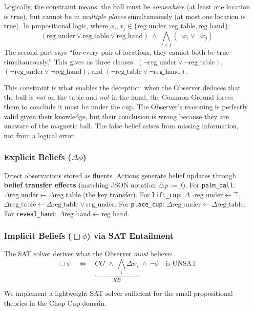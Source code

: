\documentclass[11pt]{article}
\newcommand{\EBel}[1]{\ensuremath{\Delta #1}} %
\newcommand{\IBel}[1]{\ensuremath{\Box #1}}   %
\newcommand{\CG}{\ensuremath{\mathit{CG}}}    %
\begin{document}
Logically, the constraint means: the ball must be \emph{somewhere} (at least one location is true), but cannot be in \emph{multiple places} simultaneously (at most one location is true). In propositional logic, where $x_i, x_j \in \{\text{reg\_under}, \text{reg\_table}, \text{reg\_hand}\}$:
\[
    (\text{reg\_under} \lor \text{reg\_table} \lor \text{reg\_hand}) 
    \;\land\; 
    \bigwedge_{i < j} (\neg x_i \lor \neg x_j)
\]
The second part says ``for every pair of locations, they cannot both be true simultaneously.'' This gives us three clauses: $(\neg\text{reg\_under} \lor \neg\text{reg\_table})$, $(\neg\text{reg\_under} \lor \neg\text{reg\_hand})$, and $(\neg\text{reg\_table} \lor \neg\text{reg\_hand})$.

This constraint is what enables the deception: when the Observer deduces that the ball is \emph{not} on the table and \emph{not} in the hand, the Common Ground forces them to conclude it must be under the cup. The Observer's reasoning is perfectly valid given their knowledge, but their conclusion is wrong because they are unaware of the magnetic ball. The false belief arises from missing information, not from a logical error.

\subsubsection{Explicit Beliefs ($\EBel{\phi}$)}
Direct observations stored as fluents. Actions generate belief updates through \textbf{belief transfer effects} (matching JSON notation $\triangle p := f$).
For \texttt{palm\_ball}: $\EBel{\text{reg\_under}} \gets \EBel{\text{reg\_table}}$ (the key transfer).
For \texttt{lift\_cup}: $\EBel{\neg\text{reg\_under}} \gets \top$, $\EBel{\text{reg\_table}} \gets \EBel{\text{reg\_table}} \lor \text{reg\_under}$.
For \texttt{place\_cup}: $\EBel{\text{reg\_under}} \gets \EBel{\text{reg\_table}}$.
For \texttt{reveal\_hand}: $\EBel{\text{reg\_hand}} \gets \text{reg\_hand}$.

\subsubsection{Implicit Beliefs ($\IBel{\phi}$) via SAT Entailment}
The SAT solver derives what the Observer \emph{must} believe:
\[
    \IBel{\phi} \quad \iff \quad \underbrace{\CG \;\land\; \bigwedge_i \EBel{\psi_i}}_{KB} \;\land\; \neg\phi \quad \text{is UNSAT}
\]

We implement a lightweight SAT solver sufficient for the small propositional theories in the Chop Cup domain.
\end{document}
